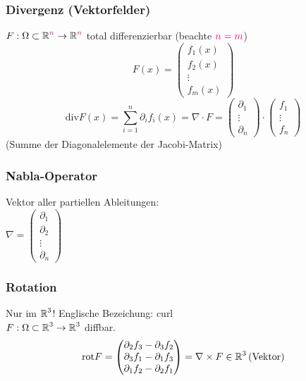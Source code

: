 \documentclass[german]{latex4ei/latex4ei_sheet}
\begin{document}
\subsubsection{Divergenz (Vektorfelder)}
$F: \Omega \subset \operatorname{\mathbb R}^{\textcolor{magenta}{n}} \rightarrow \operatorname{\mathbb R}^{\textcolor{magenta}{n}}$ total differenzierbar (beachte $\textcolor{magenta}{n=m}$)\\
\[F(x)=\begin{pmatrix}
f_1(x)\\f_2(x)\\ \vdots \\ f_m(x)
\end{pmatrix}\]
\[\mathrm{div} F(x)=\sum_{i=1}^n \partial_i f_i (x)=\nabla \cdot F=\begin{pmatrix}
\partial_1 \\ \vdots \\ \partial_n
\end{pmatrix} \cdot \begin{pmatrix}
f_1 \\ \vdots \\ f_n
\end{pmatrix}\]
(Summe der Diagonalelemente der Jacobi-Matrix)

\subsubsection{Nabla-Operator}
Vektor aller partiellen Ableitungen:\\
$\nabla=\begin{pmatrix}
\partial_1 \\ \partial_2 \\ \vdots \\ \partial_n
\end{pmatrix}$

\subsubsection{Rotation}
Nur im $\operatorname{\mathbb R}^3$! Englische Bezeichung: curl\\ 
$F:\Omega \subset \operatorname{\mathbb R}^3 \rightarrow \operatorname{\mathbb R}^3$ diffbar.\\
\[\mathrm{rot} F=\begin{pmatrix}
\partial_2 f_3 - \partial_3 f_2 \\ \partial_3 f_1 - \partial_1 f_3 \\ \partial_1 f_2 - \partial_2 f_1
\end{pmatrix}=\nabla \times F \in \operatorname{\mathbb R}^3\mathrm{(Vektor)}\]
\end{document}
